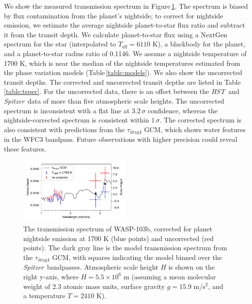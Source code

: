 \documentclass[twocolumn]{aastex61}
\newcommand{\project}[1]{\textsl{#1}}
\newcommand{\HST}{\project{HST}}
\newcommand{\Spitzer}{\project{Spitzer}}
\begin{document}
We show the measured transmission spectrum in Figure\,\ref{fig:tspec}.  The spectrum is biased by flux contamination from the planet's nightside; to correct for nightside emission, we estimate the average nightside planet-to-star flux ratio and subtract it from the transit depth. We calculate planet-to-star flux using a NextGen spectrum for the star (interpolated to $T_\mathrm{eff} = 6110$ K), a blackbody for the planet, and a planet-to-star radius ratio of 0.1146. We assume a nightside temperature of 1700 K, which is near the median of the nightside temperatures estimated from the phase variation models (Table\,\ref{table:models}). We also show the uncorrected transit depths. The corrected and uncorrected transit depths are listed in Table\,\ref{table:tspec}. For the uncorrected data, there is an offset between the \HST\ and \Spitzer\ data of more than five atmospheric scale heights.  The uncorrected spectrum is inconsistent with a flat line at $3.2\,\sigma$ confidence, whereas the nightside-corrected spectrum is consistent within $1\,\sigma$.  The corrected spectrum is also consistent with predictions from the $\tau_\mathrm{drag4}$ GCM, which shows water features in the WFC3 bandpass. Future observations with higher precision could reveal these features. %

\begin{figure}
\includegraphics[width = 0.5\textwidth]{fig9.pdf}
\caption{The transmission spectrum of WASP-103b, corrected for planet nightside emission at 1700 K (blue points) and uncorrected (red points). The dark gray line is the model transmission spectrum from the $\tau_\mathrm{drag4}$ GCM, with squares indicating the model binned over the \Spitzer\ bandpasses. Atmospheric scale height $H$ is shown on the right y-axis, where $H = 5.5\times10^6$ m (assuming a mean molecular weight of 2.3 atomic mass units, surface gravity $g = 15.9$ m/s$^2$, and a temperature $T = 2410$ K).}
\label{fig:tspec}
\end{figure}
\end{document}
